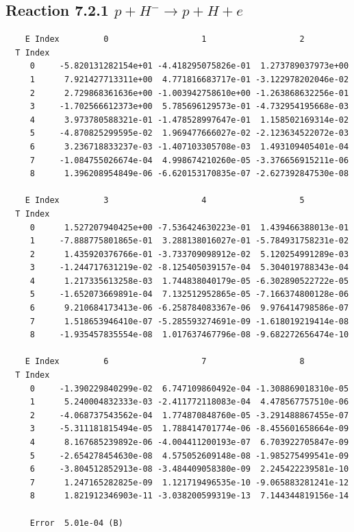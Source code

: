 \documentclass[12pt,dvipdfmx]{article}
\begin{document}
\newpage
\subsection{
Reaction 7.2.1 $   p + H^- \rightarrow p + H + e$}


\begin{small}\begin{verbatim}
    E Index         0                   1                   2
  T Index
     0     -5.820131282154e+01 -4.418295075826e-01  1.273789037973e+00
     1      7.921427713311e+00  4.771816683717e-01 -3.122978202046e-02
     2      2.729868361636e+00 -1.003942758610e+00 -1.263868632256e-01
     3     -1.702566612373e+00  5.785696129573e-01 -4.732954195668e-03
     4      3.973780588321e-01 -1.478528997647e-01  1.158502169314e-02
     5     -4.870825299595e-02  1.969477666027e-02 -2.123634522072e-03
     6      3.236718833237e-03 -1.407103305708e-03  1.493109405401e-04
     7     -1.084755026674e-04  4.998674210260e-05 -3.376656915211e-06
     8      1.396208954849e-06 -6.620153170835e-07 -2.627392847530e-08

    E Index         3                   4                   5
  T Index
     0      1.527207940425e+00 -7.536424630223e-01  1.439466388013e-01
     1     -7.888775801865e-01  3.288138016027e-01 -5.784931758231e-02
     2      1.435920376766e-01 -3.733709098912e-02  5.120254991289e-03
     3     -1.244717631219e-02 -8.125405039157e-04  5.304019788343e-04
     4      1.217335613258e-03  1.744838040179e-05 -6.302890522722e-05
     5     -1.652073669891e-04  7.132512952865e-05 -7.166374800128e-06
     6      9.210684173413e-06 -6.258784083367e-06  9.976414798586e-07
     7      1.518653946410e-07 -5.285593274691e-09 -1.618019219414e-08
     8     -1.935457835554e-08  1.017637467796e-08 -9.682272656474e-10

    E Index         6                   7                   8
  T Index
     0     -1.390229840299e-02  6.747109860492e-04 -1.308869018310e-05
     1      5.240004832333e-03 -2.411772118083e-04  4.478567757510e-06
     2     -4.068737543562e-04  1.774870848760e-05 -3.291488867455e-07
     3     -5.311181815494e-05  1.788414701774e-06 -8.455601658664e-09
     4      8.167685239892e-06 -4.004411200193e-07  6.703922705847e-09
     5     -2.654278454630e-08  4.575052609148e-08 -1.985275499541e-09
     6     -3.804512852913e-08 -3.484409058380e-09  2.245422239581e-10
     7      1.247165282825e-09  1.121719496535e-10 -9.065883281241e-12
     8      1.821912346903e-11 -3.038200599319e-13  7.144344819156e-14

     Error  5.01e-04 (B)
\end{verbatim}\end{small}
\end{document}
